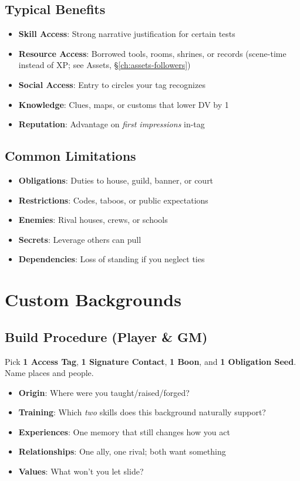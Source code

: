 \begin{multicols}{2}
\subsection*{Typical Benefits}
\begin{itemize}
\item \textbf{Skill Access}: Strong narrative justification for certain tests
\item \textbf{Resource Access}: Borrowed tools, rooms, shrines, or records (scene-time instead of XP; see Assets, \S\ref{ch:assets-followers})
\item \textbf{Social Access}: Entry to circles your tag recognizes
\item \textbf{Knowledge}: Clues, maps, or customs that lower DV by 1
\item \textbf{Reputation}: Advantage on \emph{first impressions} in-tag
\end{itemize}

\subsection*{Common Limitations}
\begin{itemize}
\item \textbf{Obligations}: Duties to house, guild, banner, or court
\item \textbf{Restrictions}: Codes, taboos, or public expectations
\item \textbf{Enemies}: Rival houses, crews, or schools
\item \textbf{Secrets}: Leverage others can pull
\item \textbf{Dependencies}: Loss of standing if you neglect ties
\end{itemize}

\section{Custom Backgrounds}

\subsection*{Build Procedure (Player \& GM)}
Pick \textbf{1 Access Tag}, \textbf{1 Signature Contact}, \textbf{1 Boon}, and \textbf{1 Obligation Seed}. Name places and people.
\begin{itemize}
\item \textbf{Origin}: Where were you taught/raised/forged?
\item \textbf{Training}: Which \emph{two} skills does this background naturally support?
\item \textbf{Experiences}: One memory that still changes how you act
\item \textbf{Relationships}: One ally, one rival; both want something
\item \textbf{Values}: What won’t you let slide?
\end{itemize}


\end{multicols}
